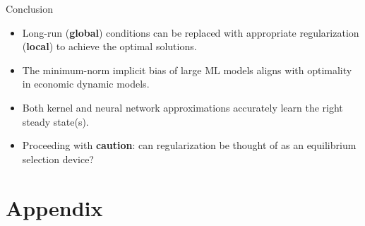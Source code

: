 \documentclass[aspectratio=169,10pt]{beamer}
\newcommand{\emphcolor}[1]{\textbf{\textcolor{emphcolorval}{#1}}}
\begin{document}
\begin{frame}{Conclusion}
	\begin{itemize}
		\item Long-run (\emphcolor{global}) conditions can be replaced with appropriate regularization (\emphcolor{local}) to achieve the optimal solutions.
		\vspace{0.1in}
		\item The minimum-norm implicit bias of large ML models aligns with optimality in economic dynamic models.
		\vspace{0.1in}
		\item Both kernel and neural network approximations accurately learn the right steady state(s).
		\vspace{0.1in}
		\item Proceeding with \emphcolor{caution}: can regularization be thought of as an equilibrium selection device?
	\end{itemize}
\end{frame}

\section{Appendix}
\end{document}

